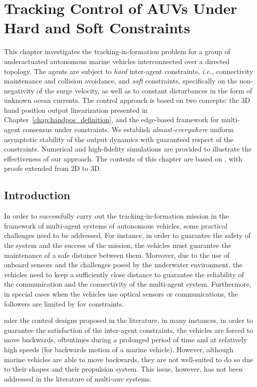 \chapter{Tracking Control of AUVs Under Hard and Soft Constraints}
\label{chap:handpos_tracking}

This chapter investigates the tracking-in-formation problem for a group of underactuated autonomous marine vehicles interconnected over a directed topology.
The agents are subject to \emph{hard} inter-agent constraints, \emph{i.e.,} connectivity maintenance and collision avoidance, and \emph{soft} constraints, specifically on the non-negativity of the surge velocity, as well as to constant disturbances in the form of unknown ocean currents.
The control approach is based on two concepts: the 3D hand position output linearization presented in Chapter~\ref{chap:handpos_definition}, and the edge-based framework for multi-agent consensus under constraints.
We establish \emph{almost-everywhere} uniform asymptotic stability of the output dynamics with guaranteed respect of the constraints.
Numerical and high-fidelity simulations are provided to illustrate the effectiveness of our approach.
The contents of this chapter are based on \cite{restrepo_formation_2022,restrepo_tracking_2023}, with proofs extended from 2D to 3D.

\section{Introduction}

In order to successfully carry out the tracking-in-formation mission in the framework of multi-agent systems of autonomous vehicles, some practical challenges need to be addressed.
For instance, in order to guarantee the safety of the system and the success of the mission, the vehicles must guarantee the maintenance of a safe distance between them. Moreover, due to the use of onboard sensors and the challenges posed by the underwater environment, the vehicles need to keep a sufficiently close distance to guarantee the reliability of the communication and the connectivity of the multi-agent system.
Furthermore, in special cases when the vehicles use optical sensors or communications, the followers are limited by \gls{fov} constraints.

nder the control designs proposed in the literature, in many instances, in order to guarantee the satisfaction of the inter-agent constraints, the vehicles are forced to move backwards, oftentimes during a prolonged period of time and at relatively high  speeds (for backwards motion of a marine vehicle). 
However, although marine vehicles are able to move backwards, they are not well-suited to do so due to their shapes and their propulsion system. 
This issue, however, has not been addressed in the literature of multi-\gls{auv} systems.

